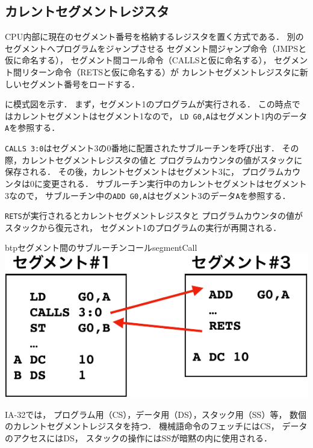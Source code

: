 \subsection{カレントセグメントレジスタ}
CPU内部に現在のセグメント番号を格納するレジスタを置く方式である．
別のセグメントへプログラムをジャンプさせる
セグメント間ジャンプ命令（JMPSと仮に命名する），
セグメント間コール命令（CALLSと仮に命名する），
セグメント間リターン命令（RETSと仮に命名する）が
カレントセグメントレジスタに新しいセグメント番号をロードする．

に模式図を示す．
まず，セグメント1のプログラムが実行される．
この時点ではカレントセグメントはセグメント1なので，
\texttt{LD G0,A}はセグメント1内のデータ\texttt{A}を参照する．

\texttt{CALLS 3:0}はセグメント3の0番地に配置されたサブルーチンを呼び出す．
その際，カレントセグメントレジスタの値と
プログラムカウンタの値がスタックに保存される．
その後，カレントセグメントはセグメント3に，
プログラムカウンタは0に変更される．
サブルーチン実行中のカレントセグメントはセグメント3なので，
サブルーチン中の\texttt{ADD G0,A}はセグメント3のデータ\texttt{A}を参照する．

\texttt{RETS}が実行されるとカレントセグメントレジスタと
プログラムカウンタの値がスタックから復元され，
セグメント1のプログラムの実行が再開される．

\begin{myfig}{btp}{セグメント間のサブルーチンコール}{segmentCall}
  \includegraphics[scale=0.6]{Fig/segmentCall-crop.pdf}
\end{myfig}

IA-32では，
プログラム用（CS），データ用（DS），スタック用（SS）等，
数個のカレントセグメントレジスタを持つ．
機械語命令のフェッチにはCS，
データのアクセスにはDS，
スタックの操作にはSSが暗黙の内に使用される\cite{ia32SegmentReg}．

